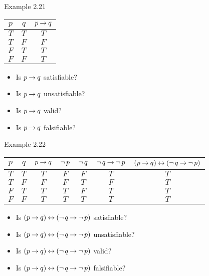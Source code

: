 \documentclass[style=sailor,size=12pt]{powerdot}
\begin{document}
\begin{wideslide}[bm=,toc=]{Example 2.21}
\begin{center}
\begin{tabular}{|c|c||c|}
\hline
$p$ & $q$ & $p \mathbin{\rightarrow} q$ \\ \hline \hline
$T$ & $T$ & $T$  \\ \hline
$T$ & $F$ & $F$  \\ \hline
$F$ & $T$ & $T$  \\ \hline
$F$ & $F$ & $T$  \\ \hline
\end{tabular}
\end{center}
\begin{itemize}
\item Is $p \mathbin{\rightarrow} q$ satisfiable?
\item Is $p \mathbin{\rightarrow} q$ unsatisfiable?
\item Is $p \mathbin{\rightarrow} q$ valid?
\item Is $p \mathbin{\rightarrow} q$ falsifiable?
\end{itemize}
\end{wideslide}

\begin{wideslide}[bm=,toc=]{Example 2.22}
\begin{center}
\begin{tabular}{|c|c||c|c|c|c|c|}
\hline
$p$ & $q$ & $p \mathbin{\rightarrow} q$ & $\mathop{\neg} p$ & $\mathop{\neg} q$ 
& $\mathop{\neg} q \mathbin{\rightarrow} \mathop{\neg} p$ & $(p\mathbin{\rightarrow} q)\mathbin{\leftrightarrow}  (\mathop{\neg} q\mathbin{\rightarrow} \mathop{\neg} p)$\\ \hline \hline
$T$ & $T$ & $T$  & $F$ & $F$  & $T$ & $T$  \\ \hline
$T$ & $F$ & $F$ & $F$ & $T$  & $F$ & $T$   \\ \hline
$F$ & $T$ & $T$ & $T$ & $F$  & $T$ & $T$   \\ \hline
$F$ & $F$ & $T$ & $T$ & $T$  & $T$ & $T$   \\ \hline
\end{tabular}
\end{center}
\begin{itemize}
\item Is $(p\mathbin{\rightarrow} q)\mathbin{\leftrightarrow}  (\mathop{\neg} q\mathbin{\rightarrow} \mathop{\neg} p)$ satisfiable?
\item Is $(p\mathbin{\rightarrow} q)\mathbin{\leftrightarrow}  (\mathop{\neg} q\mathbin{\rightarrow} \mathop{\neg} p)$ unsatisfiable?
\item Is $(p\mathbin{\rightarrow} q)\mathbin{\leftrightarrow}  (\mathop{\neg} q\mathbin{\rightarrow} \mathop{\neg} p)$ valid?
\item Is $(p\mathbin{\rightarrow} q)\mathbin{\leftrightarrow}  (\mathop{\neg} q\mathbin{\rightarrow} \mathop{\neg} p)$ falsifiable?
\end{itemize}
\end{wideslide}
\end{document}
